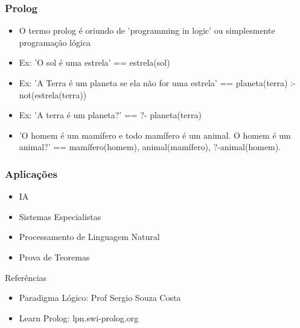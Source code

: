 \documentclass{beamer}
\begin{document}

\begin{frame}
\frametitle{Prolog}
\begin{itemize}
    \item O termo prolog é oriundo de 'programming in logic' ou simplesmente programação lógica
    \item Ex: 'O sol é uma estrela' == estrela(sol)
    \item Ex:  'A Terra é um planeta se
ela não for uma estrela' ==  planeta(terra) :- not(estrela(terra))
    \item Ex: 'A terra é um planeta?' == ?- planeta(terra)
    \item 'O homem é um mamífero e todo mamífero é um animal. O homem é um animal?' == mamífero(homem), animal(mamífero), ?-animal(homem).
\end{itemize}


\end{frame}

\begin{frame}
\frametitle{Aplicações}
\begin{itemize}
    \item IA 
    \item Sistemas Especialistas
    \item Processamento de Linguagem Natural
    \item Prova de Teoremas
\end{itemize}


\end{frame}



\begin{frame}
\Huge{\centerline{Referências}}
\begin{itemize}
    \item Paradigma Lógico: Prof Sergio Souza Costa
    \item Learn Prolog: lpn.swi-prolog.org
\end{itemize}
\end{frame}

\end{document}
